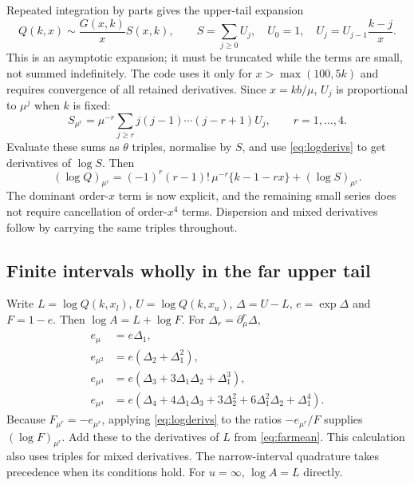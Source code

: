 \documentclass[11pt,a4paper]{article}
\begin{document}
Repeated integration by parts gives the upper-tail expansion
\begin{equation}
 Q(k,x)\sim \frac{G(x,k)}{x}S(x,k),\qquad
 S=\sum_{j\geq0}U_j,\quad U_0=1,\quad
 U_j=U_{j-1}\frac{k-j}{x}.
 \label{eq:upperexpansion}
\end{equation}
This is an asymptotic expansion; it must be truncated while the terms are
small, not summed indefinitely. The code uses it only for
$x>\max(100,5k)$ and requires convergence of all retained derivatives.
Since $x=kb/\mu$, $U_j$ is proportional to $\mu^j$ when $k$ is fixed:
\[
 S_{\mu^r}=\mu^{-r}\sum_{j\geq r}
 j(j-1)\cdots(j-r+1)U_j,\qquad r=1,\ldots,4.
\]
Evaluate these sums as $\theta$ triples, normalise by $S$, and use
\eqref{eq:logderivs} to get derivatives of $\log S$. Then
\begin{equation}
 (\log Q)_{\mu^r}
 =(-1)^r(r-1)!\,\mu^{-r}\{k-1-rx\}+(\log S)_{\mu^r}.
 \label{eq:farmean}
\end{equation}
The dominant order-$x$ term is now explicit, and the remaining small
series does not require cancellation of order-$x^4$ terms. Dispersion and
mixed derivatives follow by carrying the same triples throughout.

\subsection{Finite intervals wholly in the far upper tail}
Write $L=\log Q(k,x_l)$, $U=\log Q(k,x_u)$, $\Delta=U-L$,
$e=\exp\Delta$ and $F=1-e$. Then $\log A=L+\log F$.
For $\Delta_r=\partial_\mu^r\Delta$,
\begin{align*}
 e_\mu&=e\Delta_1,\\
 e_{\mu^2}&=e(\Delta_2+\Delta_1^2),\\
 e_{\mu^3}&=e(\Delta_3+3\Delta_1\Delta_2+\Delta_1^3),\\
 e_{\mu^4}&=e(\Delta_4+4\Delta_1\Delta_3+3\Delta_2^2
                      +6\Delta_1^2\Delta_2+\Delta_1^4).
\end{align*}
Because $F_{\mu^r}=-e_{\mu^r}$, applying \eqref{eq:logderivs} to the ratios
$-e_{\mu^r}/F$ supplies $(\log F)_{\mu^r}$. Add these to the derivatives of
$L$ from \eqref{eq:farmean}. This calculation also uses triples for mixed
derivatives. The narrow-interval quadrature takes precedence when its
conditions hold. For $u=\infty$, $\log A=L$ directly.

\newpage
\end{document}
